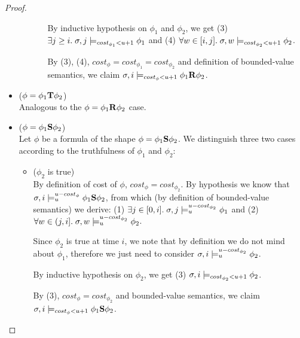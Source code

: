 \begin{theorem}
\begin{lemma}
\begin{proof}
\begin{itemize}
\begin{itemize}
\begin{itemize}
            By inductive hypothesis on $\phi_1$ and $\phi_2$, we get (3) $\exists j \geq i.\; \sigma,j \models_{cost_{\phi_1} < u + 1} \phi_1$ and (4) $\forall w \in[i,j].\; \sigma,w \models_{cost_{\phi_2} < u + 1} \phi_2$.

            By (3), (4), $cost_\phi = cost_{\phi_1} = cost_{\phi_2}$ and definition of bounded-value semantics, we claim $\sigma,i \models_{cost_\phi < u + 1} \phi_1 \mathbf{R} \phi_2$.
        \end{itemize}
    \end{itemize}
    
    \item ($\phi = \phi_1 \mathbf{T} \phi_2$) \\
    Analogous to the $\phi = \phi_1 \mathbf{R} \phi_2$ case.
    
    \item ($\phi = \phi_1 \mathbf{S} \phi_2$) \\
    Let $\phi$ be a formula of the shape $\phi = \phi_1 \mathbf{S} \phi_2$.
    We distinguish three two cases according to the truthfulness of $\phi_1$ and $\phi_2$:
    \begin{itemize}
        \item ($\phi_2$ is true) \\
        By definition of cost of $\phi$, $cost_\phi = cost_{\phi_2}$.
        By hypothesis we know that $\sigma,i \models_{u}^{u-cost_\phi} \phi_1 \mathbf{S} \phi_2$, from which (by definition of bounded-value semantics) we derive: 
        (1) $\exists j \in [0,i].\; \sigma,j \models_{u}^{u-cost_{\phi_2}} \phi_1$ and 
        (2) $\forall w \in (j,i].\; \sigma,w \models_{u}^{u-cost_{\phi_2}} \phi_2$.

        Since $\phi_2$ is true at time $i$, we note that by definition we do not mind about $\phi_1$, therefore we just need to consider $\sigma,i \models_{u}^{u-cost_{\phi_2}} \phi_2$.

        By inductive hypothesis on $\phi_2$, we get (3) $\sigma,i \models_{cost_{\phi_2} < u + 1} \phi_2$.

        By (3), $cost_\phi = cost_{\phi_2}$ and bounded-value semantics, we claim $\sigma,i \models_{cost_\phi < u + 1} \phi_1 \mathbf{S} \phi_2$.


\end{itemize}
\end{itemize}
\end{proof}
\end{lemma}
\end{theorem}
